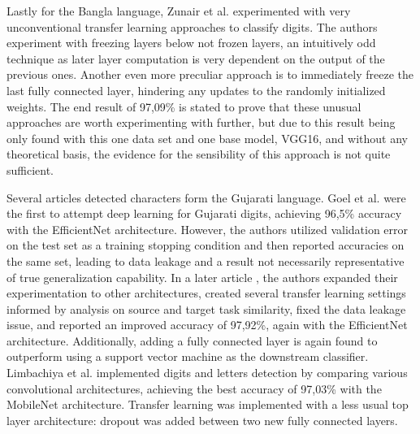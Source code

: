 \documentclass{article}
\begin{document}
Lastly for the Bangla language, Zunair et al. \cite{11zunairUnconventionalWisdom} experimented 
with very unconventional transfer learning approaches to classify digits.
The authors experiment with freezing layers below not frozen layers, an intuitively odd 
technique as later layer computation is very dependent on the output of the previous ones.
Another even more preculiar approach is to immediately freeze the last fully connected layer, 
hindering any updates to the randomly initialized weights. The end result of 97,09\% is stated 
to prove that these unusual approaches are worth experimenting with further, but due to this 
result being only found with this one data set and one base model, VGG16, and without any 
theoretical basis, the evidence for the sensibility of this approach is not quite sufficient.



Several articles detected characters form the Gujarati language.
Goel et al. \cite{10goelGujarati} were the first to attempt deep learning for Gujarati digits, 
achieving 96,5\% accuracy with the EfficientNet architecture. However, the authors utilized 
validation error on the test set as a training stopping condition and then reported accuracies 
on the same set, leading to data leakage and a result not necessarily representative of true
generalization capability. In a later article \cite{8goelGujarati2023}, the authors expanded 
their experimentation to other architectures, created several transfer learning settings informed 
by analysis on source and target task similarity, fixed the data leakage issue, and reported an 
improved accuracy of 97,92\%, again with the EfficientNet architecture. Additionally, adding a fully
connected layer is again found to outperform using a support vector machine as the downstream classifier.
Limbachiya et al. \cite{2limbachiyaGujarati} implemented digits and letters detection by comparing various convolutional architectures,
 achieving the best accuracy of 97,03\% with the MobileNet architecture. Transfer learning was implemented with a
  less usual top layer architecture: dropout was added between two new fully connected layers.
\end{document}
